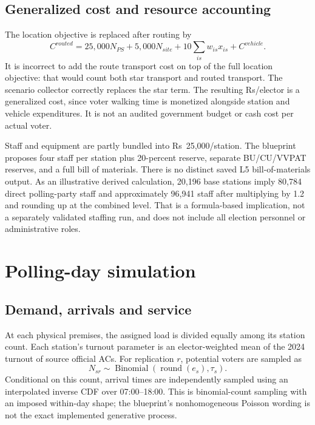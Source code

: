 \documentclass[11pt,a4paper,oneside]{report}
\newcommand{\source}[1]{\par\nopagebreak[4]{\footnotesize\color{teal}Evidence: #1.}\par}
\begin{document}
\section{Generalized cost and resource accounting}
The location objective is replaced after routing by
\begin{equation}
 C^{routed}=25,000N_{PS}+5,000N_{site}+10\sum_{is}w_{is}x_{is}+C^{vehicle}.
\end{equation}
It is incorrect to add the route transport cost on top of the full location objective: that would count both star transport and routed transport. The scenario collector correctly replaces the star term. The resulting Rs/elector is a generalized cost, since voter walking time is monetized alongside station and vehicle expenditures. It is not an audited government budget or cash cost per actual voter.

Staff and equipment are partly bundled into Rs~25,000/station. The blueprint proposes four staff per station plus 20-percent reserve, separate BU/CU/VVPAT reserves, and a full bill of materials. There is no distinct saved L5 bill-of-materials output. As an illustrative derived calculation, 20,196 base stations imply 80,784 direct polling-party staff and approximately 96,941 staff after multiplying by 1.2 and rounding up at the combined level. That is a formula-based implication, not a separately validated staffing run, and does not include all election personnel or administrative roles.
\source{[S8]--[S10], [S16]}

\chapter{Polling-day simulation}
\section{Demand, arrivals and service}
At each physical premises, the assigned load is divided equally among its station count. Each station's turnout parameter is an elector-weighted mean of the 2024 turnout of source official ACs. For replication $r$, potential voters are sampled as
\begin{equation}N_{sr}\sim\operatorname{Binomial}(\operatorname{round}(e_s),\tau_s).
\end{equation}
Conditional on this count, arrival times are independently sampled using an interpolated inverse CDF over 07:00--18:00. This is binomial-count sampling with an imposed within-day shape; the blueprint's nonhomogeneous Poisson wording is not the exact implemented generative process.
\end{document}
